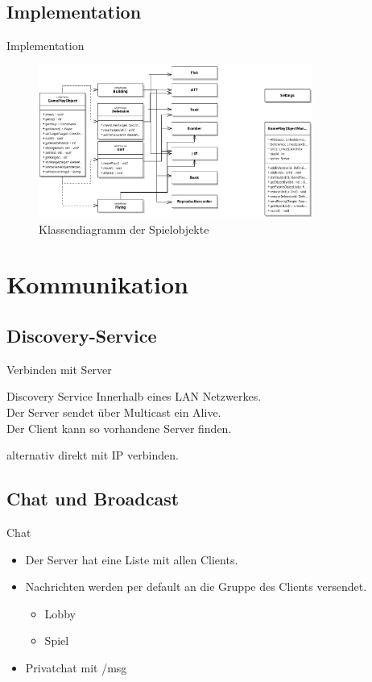 \documentclass[12pt, utf8]{beamer}
\begin{document}
\subsection{Implementation}
\begin{frame}{Implementation}
\begin{figure}
\includegraphics[width=9cm]{images/GamePlayObjects.ps}
\caption{Klassendiagramm der Spielobjekte}
\end{figure}
\end{frame}

 
\section{Kommunikation}
\subsection{Discovery-Service}
\begin{frame}{Verbinden mit Server}
\begin{exampleblock}{Discovery Service}
Innerhalb eines LAN Netzwerkes. \\
Der Server sendet über Multicast ein Alive. \\
Der Client kann so vorhandene Server finden.\
\end{exampleblock}
alternativ direkt mit IP verbinden.
\end{frame}

\subsection{Chat und Broadcast}
\begin{frame}{Chat}
	\begin{itemize}
		\item Der Server hat eine Liste mit allen Clients.
		\item Nachrichten werden per default an die Gruppe des Clients versendet.
			\begin{itemize}
				\item Lobby
				\item Spiel
			\end{itemize}
		\item Privatchat mit /msg
	\end{itemize}
\end{frame}
\end{document}
